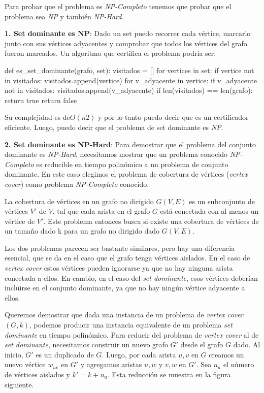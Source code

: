 \documentclass[../tp3_grupo404.tex]{subfiles}
\begin{document}
Para probar que el problema  es \emph{NP-Completo} tenemos que probar que el problema
sea \emph{NP} y también \emph{NP-Hard}.

\textbf{1. Set dominante es NP}: Dado un set puedo recorrer cada vértice, marcarlo junto con
sus vértices adyacentes y comprobar que todos los vértices del grafo fueron marcados.
Un algoritmo que certifica el problema podría ser:

\begin{alternate}[breaklines=true,numbers=left,xleftmargin=5mm]
    def es_set_dominante(grafo, set):
    visitados = []
    for vertices in set:
        if vertice not in visitados:
            visitados.append(vertice)
        for v_adyacente in vertice:
            if v_adyacente not in visitados:
                visitados.append(v_adyacente)
    if len(visitados) == len(grafo):
        return true
    return false
\end{alternate}

Su complejidad es de$ O(n2)$ y por lo tanto puedo decir que es un certificador eficiente.
Luego, puedo decir que el problema de set dominante es \emph{NP}.

\textbf{2. Set dominante es NP-Hard}: Para demostrar que el problema del conjunto dominante es \emph{NP-Hard}, 
necesitamos mostrar que un problema conocido \emph{NP-Completo} es reducible en tiempo polinómico a un problema de 
conjunto dominante. En este caso elegimos el problema de cobertura de vértices (\emph{vertex cover}) como 
problema \emph{NP-Completo} conocido.

La cobertura de vértices en un grafo no dirigido $G(V,E)$ es un subconjunto de vértices $V'$ de $V$, tal 
que cada arista en el grafo $G$ está conectada con al menos un vértice de $V'$. Este problema entonces 
busca si existe una cobertura de vértices de un tamaño dado k para un grafo no dirigido dado $G(V,E)$.

Los dos problemas parecen ser bastante similares, pero hay una diferencia esencial, que se da en el caso 
que el grafo tenga vértices aislados. En el caso de \emph{vertex cover} estos vértices pueden ignorarse ya que 
no hay ninguna arista conectada a ellos. En cambio, en el caso del \emph{set dominante}, esos vértices deberían 
incluirse en el conjunto dominante, ya que no hay ningún vértice adyacente a ellos.

Queremos demostrar que dada una instancia de un problema de \emph{vertex cover} $(G,k)$, podemos producir una 
instancia equivalente de un problema \emph{set dominante} en tiempo polinómico.
Para reducir del problema de \emph{vertex cover} al de \emph{set dominante}, necesitamos construir un nuevo grafo $G'$ 
desde el grafo $G$ dado. Al inicio, $G'$ es un duplicado de $G$. Luego, por cada arista ${u,v}$ en $G$ creamos un 
nuevo vértice $w_{uv}$ en $G'$ y agregamos aristas ${u, w}$ y ${v, w}$ en $G'$. Sea $n_{a}$ el número de 
vértices aislados y $k' = k + n_{a}$. Esta reducción se muestra en la figura siguiente.
\end{document}
